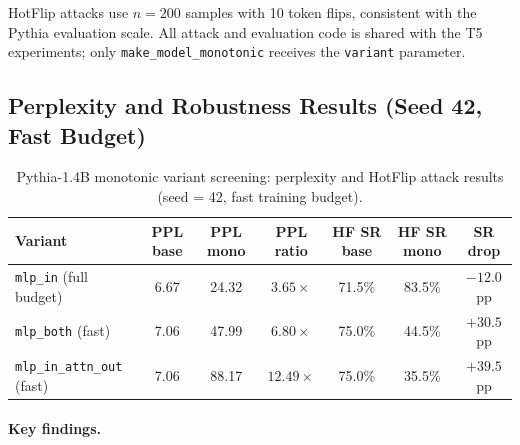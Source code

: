\documentclass{article}
\begin{document}
HotFlip attacks use $n=200$ samples with 10 token flips, consistent with the Pythia evaluation scale. All attack and evaluation code is shared with the T5 experiments; only \texttt{make\_model\_monotonic} receives the \texttt{variant} parameter.

\subsection{Perplexity and Robustness Results (Seed 42, Fast Budget)}

\begin{table}[h]
\caption{Pythia-1.4B monotonic variant screening: perplexity and HotFlip attack results (seed = 42, fast training budget).}
\label{tab:pythia-variants}
\centering
\begin{tabular}{lcccccc}
\toprule
Variant & PPL base & PPL mono & PPL ratio & HF SR base & HF SR mono & SR drop \\
\midrule
\texttt{mlp\_in} (full budget) & 6.67 & 24.32 & $3.65\times$ & 71.5\% & 83.5\% & $-12.0$pp \\
\texttt{mlp\_both} (fast)      & 7.06 & 47.99 & $6.80\times$ & 75.0\% & 44.5\% & $+30.5$pp \\
\texttt{mlp\_in\_attn\_out} (fast) & 7.06 & 88.17 & $12.49\times$ & 75.0\% & 35.5\% & $+39.5$pp \\
\bottomrule
\end{tabular}
\end{table}

\paragraph{Key findings.}
\end{document}
